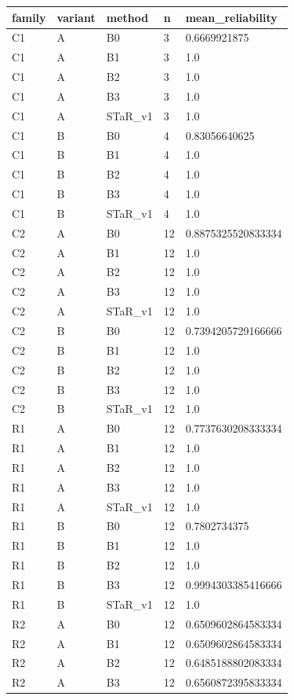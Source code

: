 \begin{tabular}{lllll}
 \hline
 family & variant & method & n & mean\_reliability \\
 \hline
 C1 & A & B0 & 3 & 0.6669921875 \\
 C1 & A & B1 & 3 & 1.0 \\
 C1 & A & B2 & 3 & 1.0 \\
 C1 & A & B3 & 3 & 1.0 \\
 C1 & A & STaR\_v1 & 3 & 1.0 \\
 C1 & B & B0 & 4 & 0.83056640625 \\
 C1 & B & B1 & 4 & 1.0 \\
 C1 & B & B2 & 4 & 1.0 \\
 C1 & B & B3 & 4 & 1.0 \\
 C1 & B & STaR\_v1 & 4 & 1.0 \\
 C2 & A & B0 & 12 & 0.8875325520833334 \\
 C2 & A & B1 & 12 & 1.0 \\
 C2 & A & B2 & 12 & 1.0 \\
 C2 & A & B3 & 12 & 1.0 \\
 C2 & A & STaR\_v1 & 12 & 1.0 \\
 C2 & B & B0 & 12 & 0.7394205729166666 \\
 C2 & B & B1 & 12 & 1.0 \\
 C2 & B & B2 & 12 & 1.0 \\
 C2 & B & B3 & 12 & 1.0 \\
 C2 & B & STaR\_v1 & 12 & 1.0 \\
 R1 & A & B0 & 12 & 0.7737630208333334 \\
 R1 & A & B1 & 12 & 1.0 \\
 R1 & A & B2 & 12 & 1.0 \\
 R1 & A & B3 & 12 & 1.0 \\
 R1 & A & STaR\_v1 & 12 & 1.0 \\
 R1 & B & B0 & 12 & 0.7802734375 \\
 R1 & B & B1 & 12 & 1.0 \\
 R1 & B & B2 & 12 & 1.0 \\
 R1 & B & B3 & 12 & 0.9994303385416666 \\
 R1 & B & STaR\_v1 & 12 & 1.0 \\
 R2 & A & B0 & 12 & 0.6509602864583334 \\
 R2 & A & B1 & 12 & 0.6509602864583334 \\
 R2 & A & B2 & 12 & 0.6485188802083334 \\
 R2 & A & B3 & 12 & 0.6560872395833334 \\

\end{tabular}
